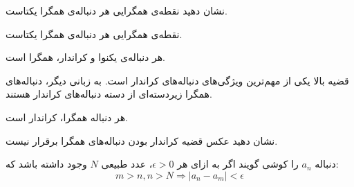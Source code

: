 \begin{PROBLEM}
  \p
  نشان دهید نقطه‌ی همگرایی هر دنباله‌ی همگرا یکتاست.

\end{PROBLEM}
    \begin{THEOREM}
      نقطه‌ی همگرایی هر دنباله‌ی همگرا یکتاست.
    \end{THEOREM}

	

  
    \begin{THEOREM}
      هر دنباله‌ی یکنوا و کراندار، همگرا است.
    \end{THEOREM}


\p
قضیه بالا یکی از مهم‌ترین ویژگی‌های دنباله‌های کراندار است.
به زبانی دیگر، دنباله‌های همگرا زیردسته‌ای از دسته دنباله‌های کراندار هستند.

  
    \begin{THEOREM}
      هر دنباله همگرا، کراندار است.
    \end{THEOREM}


\begin{PROBLEM}
  \p
  نشان دهید عکس قضیه کراندار بودن دنباله‌های همگرا برقرار نیست.
  
\end{PROBLEM}

\begin{DEFINITION}
	\p
دنباله 
$a_n$
را کوشی گویند اگر به ازای هر
$\epsilon > 0$،
عدد طبیعی
$N$
وجود داشته باشد که:
$$m > n, n > N \Rightarrow |a_n - a_m| < \epsilon$$
\end{DEFINITION}



